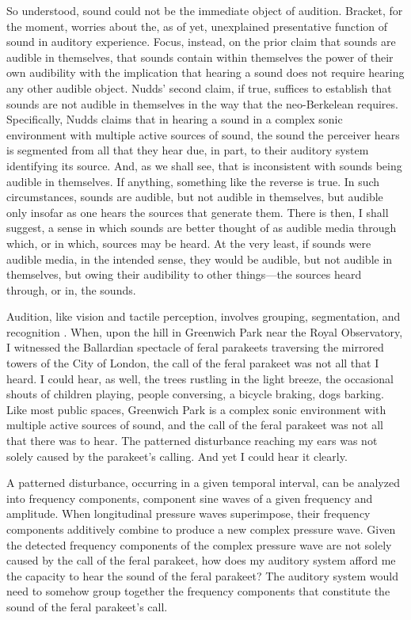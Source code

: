 So understood, sound could not be the immediate object of audition. Bracket, for the moment, worries about the, as of yet, unexplained presentative function of sound in auditory experience. Focus, instead, on the prior claim that sounds are audible in themselves, that sounds contain within themselves the power of their own audibility with the implication that hearing a sound does not require hearing any other audible object. Nudds' second claim, if true, suffices to establish that sounds are not audible in themselves in the way that the neo-Berkelean requires. Specifically, Nudds claims that in hearing a sound in a complex sonic environment with multiple active sources of sound, the sound the perceiver hears is segmented from all that they hear due, in part, to their auditory system identifying its source. And, as we shall see, that is inconsistent with sounds being audible in themselves. If anything, something like the reverse is true. In such circumstances, sounds are audible, but not audible in themselves, but audible only insofar as one hears the sources that generate them. There is then, I shall suggest, a sense in which sounds are better thought of as audible media through which, or in which, sources may be heard. At the very least, if sounds were audible media, in the intended sense, they would be audible, but not audible in themselves, but owing their audibility to other things---the sources heard through, or in, the sounds.

Audition, like vision and tactile perception, involves grouping, segmentation, and recognition \citep{Bregman:1990aa}. When, upon the hill in Greenwich Park near the Royal Observatory, I witnessed the Ballardian spectacle of feral parakeets traversing the mirrored towers of the City of London, the call of the feral parakeet was not all that I heard. I could hear, as well, the trees rustling in the light breeze, the occasional shouts of children playing, people conversing, a bicycle braking, dogs barking. Like most public spaces, Greenwich Park is a complex sonic environment with multiple active sources of sound, and the call of the feral parakeet was not all that there was to hear. The patterned disturbance reaching my ears was not solely caused by the parakeet's calling. And yet I could hear it clearly.

A patterned disturbance, occurring in a given temporal interval, can be analyzed into frequency components, component sine waves of a given frequency and amplitude. When longitudinal pressure waves superimpose, their frequency components additively combine to produce a new complex pressure wave. Given the detected frequency components of the complex pressure wave are not solely caused by the call of the feral parakeet, how does my auditory system afford me the capacity to hear the sound of the feral parakeet? The auditory system would need to somehow group together the frequency components that constitute the sound of the feral parakeet's call.


